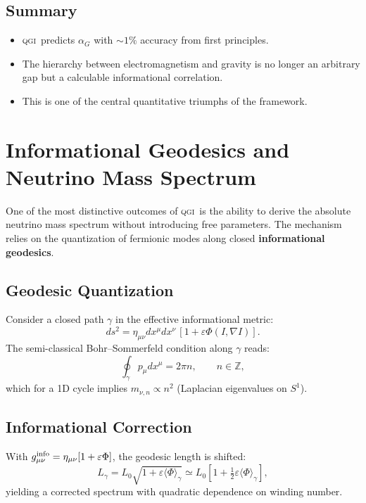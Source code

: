 \documentclass{article}
\numberwithin{equation}{section}
\theoremstyle{plain}
\theoremstyle{definition}
\theoremstyle{remark}
\newcommand{\einfo}{\varepsilon}
\newcommand{\qgi}{\textsc{qgi}}
\begin{document}
\subsection{Summary}
\begin{itemize}
    \item \qgi\ predicts $\alpha_G$ with $\sim 1\%$ accuracy from first principles.
    \item The hierarchy between electromagnetism and gravity is no longer an arbitrary gap but a calculable informational correlation.
    \item This is one of the central quantitative triumphs of the framework.
\end{itemize}


\section{Informational Geodesics and Neutrino Mass Spectrum}
\label{app:nu_geodesics}

One of the most distinctive outcomes of \qgi\ is the ability to derive the absolute neutrino mass spectrum without introducing free parameters.  
The mechanism relies on the quantization of fermionic modes along closed \textbf{informational geodesics}.  

\subsection{Geodesic Quantization}
Consider a closed path $\gamma$ in the effective informational metric:
\begin{equation}
ds^2 = \eta_{\mu\nu}dx^\mu dx^\nu\,[1+\einfo \Phi(I,\nabla I)].
\end{equation}
The semi-classical Bohr–Sommerfeld condition along $\gamma$ reads:
\begin{equation}
\oint_\gamma p_\mu dx^\mu = 2\pi n, \qquad n \in \mathbb{Z},
\end{equation}
which for a 1D cycle implies $m_{\nu,n} \propto n^2$ (Laplacian eigenvalues on $S^1$).

\subsection{Informational Correction}
With $g^{\rm info}_{\mu\nu} = \eta_{\mu\nu}[1+\einfo\Phi]$, the geodesic length is shifted:
\begin{equation}
L_\gamma = L_0 \sqrt{1+\einfo \langle \Phi \rangle_\gamma}
\simeq L_0 \left[1 + \tfrac{1}{2}\einfo \langle \Phi \rangle_\gamma\right],
\end{equation}
yielding a corrected spectrum with quadratic dependence on winding number.
\end{document}
